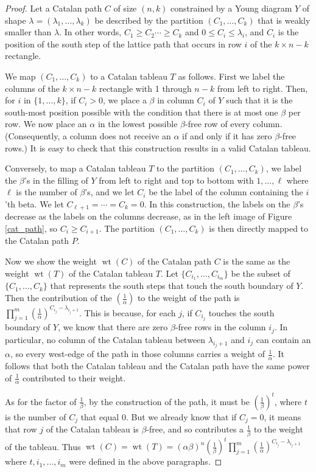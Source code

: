 \documentclass[11pt]{article}
\numberwithin{equation}{section}
\theoremstyle{plain}
\theoremstyle{definition}
\theoremstyle{remark}
\DeclareMathOperator{\wt}{wt}
\begin{document}
\begin{proof}
Let a Catalan path $C$ of size $(n,k)$ constrained by a Young diagram $Y$ of shape $\lambda=(\lambda_1,\ldots,\lambda_k)$ be described by the partition $(C_1,\ldots,C_k)$ that is weakly smaller than $\lambda$. In other words, $C_1 \geq C_2 \cdots \geq C_k$ and $0 \leq C_i \leq \lambda_i$, and $C_i$ is the position of the south step of the lattice path that occurs in row $i$ of the $k \times n-k$ rectangle. 

We map $(C_1,\ldots,C_k)$ to a Catalan tableau $T$ as follows. First we label the columns of the $k \times n-k$ rectangle with 1 through $n-k$ from left to right. Then, for $i$ in $\{1,\ldots,k\}$, if $C_i>0$, we place a $\beta$ in column $C_i$ of $Y$ such that it is the south-most position possible with the condition that there is at most one $\beta$ per row. We now place an $\alpha$ in the lowest possible $\beta$-free row of every column. (Consequently, a column does not receive an $\alpha$ if and only if it has zero $\beta$-free rows.) It is easy to check that this construction results in a valid Catalan tableau. 

Conversely, to map a Catalan tableau $T$ to the partition $(C_1,\ldots,C_k)$, we label the $\beta$'s in the filling of $Y$ from left to right and top to bottom with $1,\ldots,\ell$ where $\ell$ is the number of $\beta$'s, and we let $C_i$ be the label of the column containing the $i$'th beta. We let $C_{\ell+1}=\cdots=C_k=0$. In this construction, the labels on the $\beta$'s decrease as the labels on the columns decrease, as in the left image of Figure \ref{cat_path}, so $C_i \geq C_{i+1}$. The partition $(C_1,\ldots,C_k)$ is then directly mapped to the Catalan path $P$.

Now we show the weight $\wt(C)$ of the Catalan path $C$ is the same as the weight $\wt(T)$ of the Catalan tableau $T$.
Let $\{C_{i_1},\ldots,C_{i_m}\}$ be the subset of $\{C_1,\ldots,C_k\}$ that represents the south steps that touch the south boundary of $Y$. Then the contribution of the $\left(\frac{1}{\alpha}\right)$ to the weight of the path is $\prod_{j=1}^m \left(\frac{1}{\alpha}\right)^{C_{i_j}-\lambda_{i_j+1}}$. This is because, for each $j$, if $C_{i_j}$ touches the south boundary of $Y$, we know that there are zero $\beta$-free rows in the column $i_j$. In particular, no column of the Catalan tableau between $\lambda_{i_j+1}$ and $i_j$ can contain an $\alpha$, so every west-edge of the path in those columns carries a weight of $\frac{1}{\alpha}$. It follows that both the Catalan tableau and the Catalan path have the same power of $\frac{1}{\alpha}$ contributed to their weight.

As for the factor of $\frac{1}{\beta}$, by the construction of the path, it must be $\left(\frac{1}{\beta}\right)^t$, where $t$ is the number of $C_j$ that equal 0. But we already know that if $C_j=0$, it means that row $j$ of the Catalan tableau is $\beta$-free, and so contributes a $\frac{1}{\beta}$ to the weight of the tableau. Thus $\wt(C)=\wt(T)=(\alpha\beta)^n\left(\frac{1}{\beta}\right)^t\prod_{j=1}^m \left(\frac{1}{\alpha}\right)^{C_{i_j}-\lambda_{i_j+1}}$ where $t,i_1,\ldots,i_m$ were defined in the above paragraphs.
\end{proof}
\end{document}
